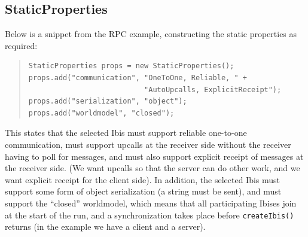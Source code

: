 \documentclass[10pt]{article}
\newcommand{\mysubsection}[1]{\subsection{#1}\label{#1}}
\begin{document}
\mysubsection{StaticProperties}

Below is a snippet from the RPC example, constructing the static
properties as required:
\begin{quote}
\begin{verbatim}
StaticProperties props = new StaticProperties();
props.add("communication", "OneToOne, Reliable, " + 
                           "AutoUpcalls, ExplicitReceipt");
props.add("serialization", "object");
props.add("worldmodel", "closed");
\end{verbatim}
\end{quote}
This states that the selected Ibis must support reliable one-to-one
communication, must support upcalls at the receiver side without the
receiver having to poll for messages, and must also support explicit
receipt of messages at the receiver side.
(We want upcalls so that the server can do other work, and we want
explicit receipt for the client side).
In addition, the selected Ibis must support some form of object
serialization (a string must be sent),
and must support the ``closed'' worldmodel, which means
that all participating Ibises join at the start of the run, and a
synchronization takes place before \texttt{createIbis()} returns
(in the example we have a client and a server).
\end{document}
